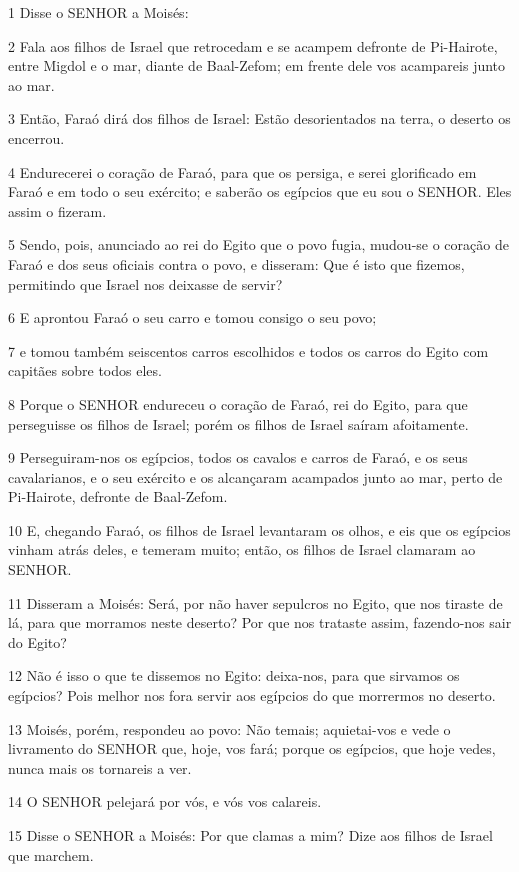\par 1 Disse o SENHOR a Moisés:
\par 2 Fala aos filhos de Israel que retrocedam e se acampem defronte de Pi-Hairote, entre Migdol e o mar, diante de Baal-Zefom; em frente dele vos acampareis junto ao mar.
\par 3 Então, Faraó dirá dos filhos de Israel: Estão desorientados na terra, o deserto os encerrou.
\par 4 Endurecerei o coração de Faraó, para que os persiga, e serei glorificado em Faraó e em todo o seu exército; e saberão os egípcios que eu sou o SENHOR. Eles assim o fizeram.
\par 5 Sendo, pois, anunciado ao rei do Egito que o povo fugia, mudou-se o coração de Faraó e dos seus oficiais contra o povo, e disseram: Que é isto que fizemos, permitindo que Israel nos deixasse de servir?
\par 6 E aprontou Faraó o seu carro e tomou consigo o seu povo;
\par 7 e tomou também seiscentos carros escolhidos e todos os carros do Egito com capitães sobre todos eles.
\par 8 Porque o SENHOR endureceu o coração de Faraó, rei do Egito, para que perseguisse os filhos de Israel; porém os filhos de Israel saíram afoitamente.
\par 9 Perseguiram-nos os egípcios, todos os cavalos e carros de Faraó, e os seus cavalarianos, e o seu exército e os alcançaram acampados junto ao mar, perto de Pi-Hairote, defronte de Baal-Zefom.
\par 10 E, chegando Faraó, os filhos de Israel levantaram os olhos, e eis que os egípcios vinham atrás deles, e temeram muito; então, os filhos de Israel clamaram ao SENHOR.
\par 11 Disseram a Moisés: Será, por não haver sepulcros no Egito, que nos tiraste de lá, para que morramos neste deserto? Por que nos trataste assim, fazendo-nos sair do Egito?
\par 12 Não é isso o que te dissemos no Egito: deixa-nos, para que sirvamos os egípcios? Pois melhor nos fora servir aos egípcios do que morrermos no deserto.
\par 13 Moisés, porém, respondeu ao povo: Não temais; aquietai-vos e vede o livramento do SENHOR que, hoje, vos fará; porque os egípcios, que hoje vedes, nunca mais os tornareis a ver.
\par 14 O SENHOR pelejará por vós, e vós vos calareis.
\par 15 Disse o SENHOR a Moisés: Por que clamas a mim? Dize aos filhos de Israel que marchem.
